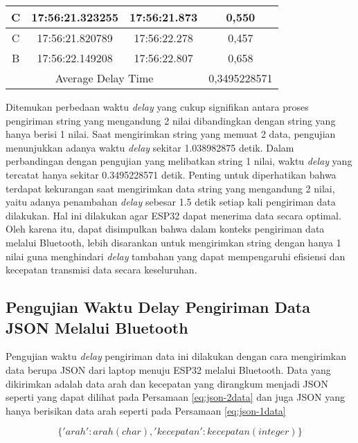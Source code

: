 \begin{table}[]
\begin{tabular}{|ccc|c|}
  \multicolumn{1}{|c|}{C}    & \multicolumn{1}{c|}{17:56:21.323255} & 17:56:21.873       & 0,550        \\ \hline
  \multicolumn{1}{|c|}{C}    & \multicolumn{1}{c|}{17:56:21.820789} & 17:56:22.278       & 0,457        \\ \hline
  \multicolumn{1}{|c|}{B}    & \multicolumn{1}{c|}{17:56:22.149208} & 17:56:22.807       & 0,658        \\ \hline
  \multicolumn{3}{|c|}{Average Delay Time}                                               & 0,3495228571 \\ \hline
  \end{tabular}
\end{table}

\newpage

Ditemukan perbedaan waktu \emph{delay} yang cukup signifikan antara proses pengiriman string yang mengandung 2 nilai dibandingkan dengan string yang hanya berisi 1 nilai. Saat mengirimkan string yang memuat 2 data, pengujian menunjukkan adanya waktu \emph{delay} sekitar 1.038982875 detik. Dalam perbandingan dengan pengujian yang melibatkan string 1 nilai, waktu \emph{delay} yang tercatat hanya sekitar 0.3495228571 detik. Penting untuk diperhatikan bahwa terdapat kekurangan saat mengirimkan data string yang mengandung 2 nilai, yaitu adanya penambahan \emph{delay} sebesar 1.5 detik setiap kali pengiriman data dilakukan. Hal ini dilakukan agar ESP32 dapat menerima data secara optimal. Oleh karena itu, dapat disimpulkan bahwa dalam konteks pengiriman data melalui Bluetooth, lebih disarankan untuk mengirimkan string dengan hanya 1 nilai guna menghindari \emph{delay} tambahan yang dapat mempengaruhi efisiensi dan kecepatan transmisi data secara keseluruhan.

\subsection{Pengujian Waktu Delay Pengiriman Data JSON Melalui Bluetooth}

Pengujian waktu \emph{delay} pengiriman data ini dilakukan dengan cara mengirimkan data berupa JSON dari laptop menuju ESP32 melalui Bluetooth. Data yang dikirimkan adalah data arah dan kecepatan yang dirangkum menjadi JSON seperti yang dapat dilihat pada Persamaan \ref{eq:json-2data} dan juga JSON yang hanya berisikan data arah seperti pada Persamaan \ref{eq:json-1data}

\begin{equation}
  \label{eq:json-2data}
    \{'arah': arah(char), 'kecepatan': kecepatan(integer)\}
\end{equation}

